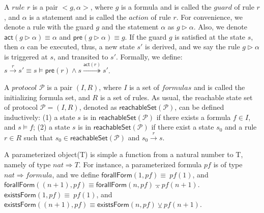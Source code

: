 \documentclass[conference]{IEEEtran}
\def \andc {\barwedge }
\def \orc {\veebar }
\begin{document}
A $rule$ $r$ is a pair $<g,\alpha>$, where $g$ is a formula and is called the $guard$ of rule $r$, and $\alpha$ is a statement and is called the $action$ of rule $r$.
 For convenience, we denote a rule with the guard $g$ and the statement $\alpha$ as $g \vartriangleright \alpha$. Also, we denote $\mathsf{act}(g \vartriangleright \alpha)\equiv \alpha$ and $\mathsf{pre}(g \vartriangleright \alpha)\equiv g$. If the guard $g$ is satisfied at the state $s$, then $\alpha$ can be executed, thus, a new state $s'$ is derived, and we say the rule $g \vartriangleright \alpha$ is triggered at $s$, and transited to $s'$. Formally, we define: $s\overset{r}{\rightarrow } s' \equiv s\models \mathsf{pre}(r) \wedge s\overset{\mathsf{act}(r)}{\twoheadrightarrow } s'$.

A $protocol$ $\mathcal{P}$ is a pair $(I,R)$, where $I$ is a set of $formulas$ and is called the initializing formula  set, and $R$ is a set of rules. %
 As usual, the reachable state set of protocol  $\mathcal{P}=(I,R)$, denoted as $\mathsf{reachableSet}(\mathcal{P})$, can be defined inductively: (1) a state $s$ is in
$\mathsf{reachableSet}(\mathcal{P})$ if there exists a formula $f \in I$, and $s \models  f$; (2) a state $s$ is in
$\mathsf{reachableSet}(\mathcal{P})$ if there exist a  state $s_0$  and a rule $r \in R$ such that $s_0 \in \mathsf{reachableSet}(\mathcal{P})$ and $s_0\overset{r}{\rightarrow } s$.

A parameterized object(T) is simple a function from a natural number to T, namely of type $nat \Rightarrow T$. For instance, a parameterized formula $pf$ is of type $nat \Rightarrow formula$, and we define
$\mathsf{forallForm}(1,pf)\equiv~pf(1)$, and $\mathsf{forallForm}((n+1),pf)\equiv\mathsf{forallForm}(n,pf) \andc pf(n +1)$. $\mathsf{existsForm}(1,pf)\equiv~pf(1)$, and $\mathsf{existsForm}((n+1),pf)\equiv\mathsf{existsForm}(n,pf) \orc pf(n +1)$.
\end{document}
